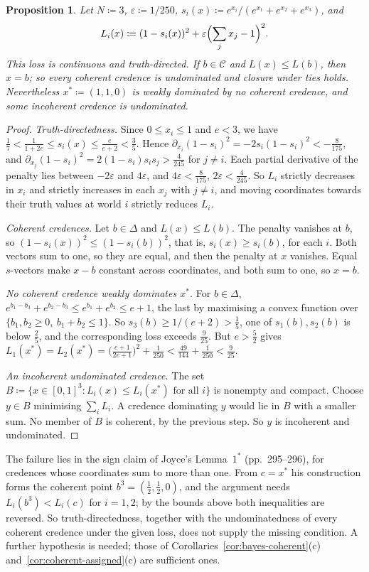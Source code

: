\documentclass[11pt]{article}
\newtheorem{proposition}[theorem]{Proposition}
\theoremstyle{definition}
\theoremstyle{remark}
\newcommand{\C}{\mathcal C}
\begin{document}
\begin{proposition}\label{prop:joyce}
Let $N\coloneqq3$, $\varepsilon\coloneqq1/250$, $s_i(x)\coloneqq e^{x_i}/(e^{x_1}+e^{x_2}+e^{x_3})$, and
\[
L_i(x)\coloneqq(1-s_i(x))^2+\varepsilon\Bigl(\sum_jx_j-1\Bigr)^2.
\]
This loss is continuous and truth-directed. If $b\in\C$ and $L(x)\le L(b)$, then $x=b$; so every coherent credence is undominated and closure under ties holds. Nevertheless $x^*\coloneqq(1,1,0)$ is weakly dominated by no coherent credence, and some incoherent credence is undominated.
\end{proposition}
\begin{proof}
\emph{Truth-directedness.} Since $0\le x_i\le1$ and $e<3$, we have $\frac17<\frac1{1+2e}\le s_i(x)\le\frac e{e+2}<\frac35$. Hence $\partial_{x_i}(1-s_i)^2=-2s_i(1-s_i)^2<-\frac8{175}$, and $\partial_{x_j}(1-s_i)^2=2(1-s_i)s_is_j>\frac4{245}$ for $j\ne i$. Each partial derivative of the penalty lies between $-2\varepsilon$ and $4\varepsilon$, and $4\varepsilon<\frac8{175}$, $2\varepsilon<\frac4{245}$. So $L_i$ strictly decreases in $x_i$ and strictly increases in each $x_j$ with $j\ne i$, and moving coordinates towards their truth values at world $i$ strictly reduces $L_i$.

\emph{Coherent credences.} Let $b\in\Delta$ and $L(x)\le L(b)$. The penalty vanishes at $b$, so $(1-s_i(x))^2\le(1-s_i(b))^2$, that is, $s_i(x)\ge s_i(b)$, for each $i$. Both vectors sum to one, so they are equal, and then the penalty at $x$ vanishes. Equal $s$-vectors make $x-b$ constant across coordinates, and both sum to one, so $x=b$.

\emph{No coherent credence weakly dominates $x^*$.} For $b\in\Delta$, $e^{b_1-b_3}+e^{b_2-b_3}\le e^{b_1}+e^{b_2}\le e+1$, the last by maximising a convex function over $\{b_1,b_2\ge0,\ b_1+b_2\le1\}$. So $s_3(b)\ge1/(e+2)>\frac15$, one of $s_1(b),s_2(b)$ is below $\frac25$, and the corresponding loss exceeds $\frac9{25}$. But $e>\frac52$ gives $L_1(x^*)=L_2(x^*)=\bigl(\frac{e+1}{2e+1}\bigr)^2+\frac1{250}<\frac{49}{144}+\frac1{250}<\frac9{25}$.

\emph{An incoherent undominated credence.} The set $B\coloneqq\{x\in[0,1]^3:L_i(x)\le L_i(x^*)\text{ for all }i\}$ is nonempty and compact. Choose $y\in B$ minimising $\sum_iL_i$. A credence dominating $y$ would lie in $B$ with a smaller sum. No member of $B$ is coherent, by the previous step. So $y$ is incoherent and undominated.
\end{proof}

The failure lies in the sign claim of Joyce's Lemma~$1^*$ (pp.~295--296), for credences whose coordinates sum to more than one. From $c=x^*$ his construction forms the coherent point $b^3=(\frac12,\frac12,0)$, and the argument needs $L_i(b^3)<L_i(c)$ for $i=1,2$; by the bounds above both inequalities are reversed. So truth-directedness, together with the undominatedness of every coherent credence under the given loss, does not supply the missing condition. A further hypothesis is needed; those of Corollaries~\ref{cor:bayes-coherent}(c) and~\ref{cor:coherent-assigned}(c) are sufficient ones.
\end{document}

